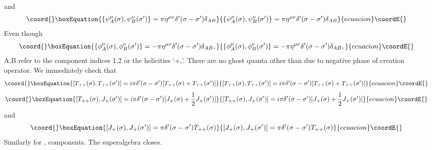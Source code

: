 \documentclass[a4paper,showpacs,preprintnumbers,amsmath,amssymb]{revtex4}
\begin{document}
and
\begin{equation}\coord{}\boxEquation{
\{ \psi_A^{\mu}(\sigma) , \psi_B^{\nu}(\sigma')\} =
\pi \eta^{\mu\nu}\delta'(\sigma-\sigma')\delta_{AB}
}{
\{ \psi_A^{\mu}(\sigma) , \psi_B^{\nu}(\sigma')\} =
\pi \eta^{\mu\nu}\delta'(\sigma-\sigma')\delta_{AB}
}{ecuacion}\coordE{}\end{equation}
Even though
\begin{equation}\coord{}\boxEquation{
\{ \phi_A^{\mu}(\sigma) , \phi_B^{\nu}(\sigma')\} =-
\pi \eta^{\mu\nu}\delta'(\sigma-\sigma')\delta_{AB},
}{
\{ \phi_A^{\mu}(\sigma) , \phi_B^{\nu}(\sigma')\} =-
\pi \eta^{\mu\nu}\delta'(\sigma-\sigma')\delta_{AB},
}{ecuacion}\coordE{}\end{equation}
A,B refer to the component indices 1,2 or the helicities `+,\myHighlight{$-$}\coordHE{}'.
There are no ghost quanta other than \coordHE{} due to negative phase of 
creation operator. We immediately check that
\begin{equation}\coord{}\boxEquation{
[ T_{++}(\sigma),  T_{++}(\sigma') ] =i\pi\delta'(\sigma-\sigma') [T_{++}(\sigma)+
 T_{++}(\sigma') ]
}{
[ T_{++}(\sigma),  T_{++}(\sigma') ] =i\pi\delta'(\sigma-\sigma') [T_{++}(\sigma)+
 T_{++}(\sigma') ]
}{ecuacion}\coordE{}\end{equation}
\begin{equation}\coord{}\boxEquation{
[T_{++}(\sigma),  J_{+}(\sigma')] =
i\pi\delta'(\sigma-\sigma') [ J_{+}(\sigma)+\frac{1}{2} J_{+}(\sigma') ]
}{
[T_{++}(\sigma),  J_{+}(\sigma')] =
i\pi\delta'(\sigma-\sigma') [ J_{+}(\sigma)+\frac{1}{2} J_{+}(\sigma') ]
}{ecuacion}\coordE{}\end{equation}
and
\begin{equation}\coord{}\boxEquation{
[J_{+}(\sigma),  J_{+}(\sigma')] =\pi\delta'(\sigma-\sigma')T_{++}(\sigma)
}{
[J_{+}(\sigma),  J_{+}(\sigma')] =\pi\delta'(\sigma-\sigma')T_{++}(\sigma)
}{ecuacion}\coordE{}\end{equation}
Similarly for \myHighlight{$-~-$}\coordHE{} , \myHighlight{$-$}\coordHE{} components. The superalgebra closes.
\end{document}
